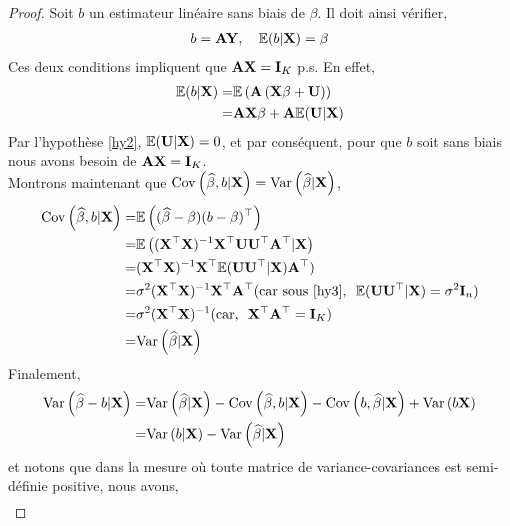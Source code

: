 \begin{proof}
Soit $b$ un estimateur linéaire sans biais de $\beta$. Il doit ainsi vérifier,
\begin{align*}
b=\mathbf{A}\mathbf{Y}, \ \ \ \mathbb{E}(b|\mathbf{X}) = \beta
\end{align*} 
Ces deux conditions impliquent que $\mathbf{A}\mathbf{X} =\mathbf{I}_K$ p.s. En effet,
\begin{align*}
\mathbb{E}(b | \mathbf{X}) = &\mathbb{E}\left(\mathbf{A}\left(\mathbf{X}\beta + \mathbf{U}\right)\right)\\
=&\mathbf{A}\mathbf{X}\beta + \mathbf{A}\mathbb{E}(\mathbf{U}| \mathbf{X})
\end{align*}
Par l'hypothèse \ref{hy2}, $\mathbb{E}(\mathbf{U} | \mathbf{X}) = 0$, et par conséquent, pour que $b$ soit sans biais nous avons besoin de $\mathbf{A}\mathbf{X} = \mathbf{I}_K$.\\
Montrons maintenant que $\mathrm{Cov}\left(\widehat{\beta}, b | \mathbf{X}\right) = \mathrm{Var}\left(\widehat{\beta} | \mathbf{X}\right)$,
\begin{align*}
\mathrm{Cov}\left(\widehat{\beta}, b | \mathbf{X}\right) =& \mathbb{E}\left((\widehat{\beta} - \beta)(b-\beta)^\top\right)\\
=&\mathbb{E}\left((\mathbf{X}^\top\mathbf{X})^{-1}\mathbf{X}^\top\mathbf{U}\mathbf{U}^\top\mathbf{A}^\top | \mathbf{X}\right)\\
=&(\mathbf{X}^\top\mathbf{X})^{-1}\mathbf{X}^\top\mathbb{E}(\mathbf{U}\mathbf{U}^\top|\mathbf{X})\mathbf{A}^\top)\\
=&\sigma^2(\mathbf{X}^\top\mathbf{X})^{-1}\mathbf{X}^\top\mathbf{A}^\top(\textrm{car sous \ref{hy3}, \  } \mathbb{E}(\mathbf{U}\mathbf{U}^\top| \mathbf{X}) = \sigma^2\mathbf{I}_n)\\
=&\sigma^2(\mathbf{X}^\top\mathbf{X})^{-1}(\textrm{car, \ } \mathbf{X}^\top\mathbf{A}^\top = \mathbf{I}_K)\\
=&\mathrm{Var}\left(\widehat{\beta}| \mathbf{X}\right)
\end{align*}
Finalement, 
\begin{align}
\mathrm{Var}\left(\widehat{\beta} - b | \mathbf{X}\right) =&\mathrm{Var}\left(\widehat{\beta}| \mathbf{X}\right) - \mathrm{Cov}\left(\widehat{\beta}, b | \mathbf{X}\right) - \mathrm{Cov}\left(b, \widehat{\beta} | \mathbf{X}\right) + \mathrm{Var}\left(b\mathbf{X}\right)\nonumber\\
=&   \mathrm{Var}\left(b | \mathbf{X}\right) - \mathrm{Var}\left(\widehat{\beta}| \mathbf{X}\right)
\label{eq14}
\end{align}
et notons que dans la mesure où toute matrice de variance-covariances est semi-définie positive, nous avons,
\begin{align*}

\end{align*}
\end{proof}
